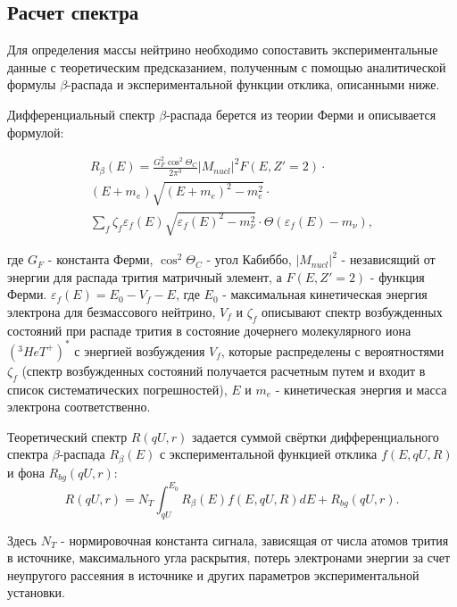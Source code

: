 ﻿\documentclass[a4paper,14pt]{extarticle}
\begin{document}
    
    \subsection{Расчет спектра}
    Для определения массы нейтрино необходимо сопоставить экспериментальные данные
    с теоретическим предсказанием, полученным с помощью аналитической формулы $\beta$-распада
    и экспериментальной функции отклика, описанными ниже.
    
    Дифференциальный спектр $\beta$-распада берется из теории Ферми и описывается
    формулой:
    
    \begin{equation}
      \begin{split}
        R_{\beta}(E) = \frac{G_F^2 \cos^2 \Theta_C}{2 \pi^3} |M_{nucl}|^2 F(E, Z'=2) \cdot \\
        (E + m_e) \sqrt{(E+m_e)^2-m_e^2} \cdot \\
        \displaystyle\sum_f \zeta_f \varepsilon_f(E) \sqrt{\varepsilon_f(E)^2-m_{\nu}^2} \cdot \Theta(\varepsilon_f(E)-m_{\nu}),
      \end{split}
    \end{equation}
    
    \noindent где $G_F$ - константа Ферми, $\cos^2 \Theta_C$ - угол Кабиббо, $|M_{nucl}|^2$ - независящий от энергии для распада трития матричный
    элемент, а $F(E, Z'=2)$ - функция Ферми. $\varepsilon_f(E) = E_0 - V_f - E$, где $E_0$ - максимальная кинетическая
    энергия электрона для безмассового нейтрино, $V_f$ и $\zeta_f$ описывают спектр возбужденных состояний при распаде
    трития в состояние дочернего молекулярного иона $(^3HeT^+)^*$ с энергией возбуждения $V_f$, которые распределены с
    вероятностями $\zeta_f$ (спектр возбужденных состояний получается расчетным путем и входит в список 
    систематических погрешностей), $E$ и $m_e$ - кинетическая энергия и масса электрона соответственно.
    
    Теоретический спектр $R(qU,r)$ задается суммой свёртки дифференциального спектра $\beta$-распада $R_{\beta}(E)$ 
    с экспериментальной функцией отклика $f(E,qU,R)$ и фона $R_{bg}(qU,r)$:
    \begin{equation}
      R(qU,r)=N_T \int_{qU}^{E_0} R_{\beta}(E)f(E,qU,R)dE + R_{bg}(qU,r).
    \end{equation}
    
    Здесь $N_T$ - нормировочная константа сигнала, зависящая от числа атомов трития в источнике, максимального угла
    раскрытия, потерь электронами энергии за счет неупругого рассеяния в источнике и других параметров
    экспериментальной установки. 
    
\end{document}
